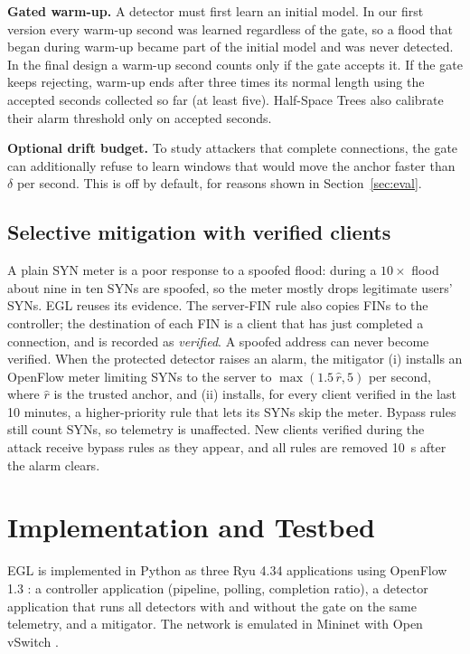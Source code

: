 \documentclass[conference]{IEEEtran}
\begin{document}
\textbf{Gated warm-up.} A detector must first learn an initial model. In our first version every warm-up second was learned regardless of the gate, so a flood that began during warm-up became part of the initial model and was never detected. In the final design a warm-up second counts only if the gate accepts it. If the gate keeps rejecting, warm-up ends after three times its normal length using the accepted seconds collected so far (at least five). Half-Space Trees also calibrate their alarm threshold only on accepted seconds.

\textbf{Optional drift budget.} To study attackers that complete connections, the gate can additionally refuse to learn windows that would move the anchor faster than $\delta$ per second. This is off by default, for reasons shown in Section~\ref{sec:eval}.

\subsection{Selective mitigation with verified clients}
A plain SYN meter is a poor response to a spoofed flood: during a $10\times$ flood about nine in ten SYNs are spoofed, so the meter mostly drops legitimate users' SYNs. EGL reuses its evidence. The server-FIN rule also copies FINs to the controller; the destination of each FIN is a client that has just completed a connection, and is recorded as \emph{verified}. A spoofed address can never become verified. When the protected detector raises an alarm, the mitigator (i) installs an OpenFlow meter limiting SYNs to the server to $\max(1.5\,\hat{r}, 5)$ per second, where $\hat{r}$ is the trusted anchor, and (ii) installs, for every client verified in the last 10 minutes, a higher-priority rule that lets its SYNs skip the meter. Bypass rules still count SYNs, so telemetry is unaffected. New clients verified during the attack receive bypass rules as they appear, and all rules are removed 10~s after the alarm clears.

\section{Implementation and Testbed}\label{sec:impl}
EGL is implemented in Python as three Ryu 4.34 \cite{ryu} applications using OpenFlow 1.3 \cite{onf2012of13}: a controller application (pipeline, polling, completion ratio), a detector application that runs all detectors with and without the gate on the same telemetry, and a mitigator. The network is emulated in Mininet \cite{lantz2010mininet} with Open vSwitch \cite{pfaff2015ovs}.
\end{document}
